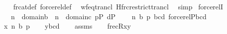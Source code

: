 \begin{isabellebody}
%
\isadelimproof
\ \ %
\endisadelimproof
%
\isatagproof
{}\isamarkupfalse%
\ frc{\isacharunderscore}{\kern0pt}at{\isacharunderscore}{\kern0pt}def\ forcerel{\isacharunderscore}{\kern0pt}def\ \isamarkupfalse%
\ wf{\isacharunderscore}{\kern0pt}eq{\isacharunderscore}{\kern0pt}trancl\ Hfrc{\isacharunderscore}{\kern0pt}restrict{\isacharunderscore}{\kern0pt}trancl\ \isamarkupfalse%
\ simp%
\endisatagproof
{\isafoldproof}%
%
\isadelimproof
\isanewline
%
\endisadelimproof
\isanewline
\isanewline
{}\isamarkupfalse%
\ forcerelI{}\ {\isacharcolon}{\kern0pt}\isanewline
\ \ \ {\isachardoublequoteopen}n{}\ {\isasymin}\ domain{\isacharparenleft}{\kern0pt}b{\isacharparenright}{\kern0pt}\ {\isasymor}\ n{}\ {\isasymin}\ domain{\isacharparenleft}{\kern0pt}c{\isacharparenright}{\kern0pt}{\isachardoublequoteclose}\ {\isachardoublequoteopen}p{\isasymin}P{\isachardoublequoteclose}\ {\isachardoublequoteopen}d{\isasymin}P{\isachardoublequoteclose}\isanewline
\ \ \ {\isachardoublequoteopen}{\isasymlangle}{\isasymlangle}{}{\isacharcomma}{\kern0pt}\ n{}{\isacharcomma}{\kern0pt}\ b{\isacharcomma}{\kern0pt}\ p{\isasymrangle}{\isacharcomma}{\kern0pt}\ {\isasymlangle}{}{\isacharcomma}{\kern0pt}b{\isacharcomma}{\kern0pt}c{\isacharcomma}{\kern0pt}d{\isasymrangle}{\isasymrangle}{\isasymin}\ forcerel{\isacharparenleft}{\kern0pt}P{\isacharcomma}{\kern0pt}{\isasymlangle}{}{\isacharcomma}{\kern0pt}b{\isacharcomma}{\kern0pt}c{\isacharcomma}{\kern0pt}d{\isasymrangle}{\isacharparenright}{\kern0pt}{\isachardoublequoteclose}\isanewline
%
\isadelimproof
%
\endisadelimproof
%
\isatagproof
{}\isamarkupfalse%
\ {\isacharminus}{\kern0pt}\isanewline
\ \ \isamarkupfalse%
\ {\isacharquery}{\kern0pt}x{\isacharequal}{\kern0pt}{\isachardoublequoteopen}{\isasymlangle}{}{\isacharcomma}{\kern0pt}\ n{}{\isacharcomma}{\kern0pt}\ b{\isacharcomma}{\kern0pt}\ p{\isasymrangle}{\isachardoublequoteclose}\isanewline
\ \ \isamarkupfalse%
\ {\isacharquery}{\kern0pt}y{\isacharequal}{\kern0pt}{\isachardoublequoteopen}{\isasymlangle}{}{\isacharcomma}{\kern0pt}b{\isacharcomma}{\kern0pt}c{\isacharcomma}{\kern0pt}d{\isasymrangle}{\isachardoublequoteclose}\isanewline
\ \ \isamarkupfalse%
\ assms\isanewline
\ \ \isamarkupfalse%
\ {\isachardoublequoteopen}frecR{\isacharparenleft}{\kern0pt}{\isacharquery}{\kern0pt}x{\isacharcomma}{\kern0pt}{\isacharquery}{\kern0pt}y{\isacharparenright}{\kern0pt}{\isachardoublequoteclose}\isanewline

\end{isabellebody}
